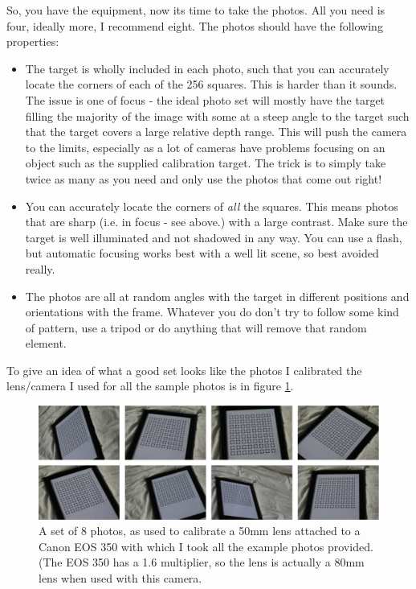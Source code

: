 \documentclass[10pt,a4paper,twoside]{article}
\begin{document}
So, you have the equipment, now its time to take the photos. All you need is four, ideally more, I recommend eight. The photos should have the following properties:
\begin{itemize}
\item The target is wholly included in each photo, such that you can accurately locate the corners of each of the 256 squares. This is harder than it sounds. The issue is one of focus - the ideal photo set will mostly have the target filling the majority of the image with some at a steep angle to the target such that the target covers a large relative depth range. This will push the camera to the limits, especially as a lot of cameras have problems focusing on an object such as the supplied calibration target. The trick is to simply take twice as many as you need and only use the photos that come out right!
\item You can accurately locate the corners of \emph{all} the squares. This means photos that are sharp (i.e. in focus - see above.) with a large contrast. Make sure the target is well illuminated and not shadowed in any way. You can use a flash, but automatic focusing works best with a well lit scene, so best avoided really.
\item The photos are all at random angles with the target in different positions and orientations with the frame. Whatever you do don't try to follow some kind of pattern, use a tripod or do anything that will remove that random element.
\end{itemize}
To give an idea of what a good set looks like the photos I calibrated the lens/camera I used for all the sample photos is in figure \ref{fig:calib_images}.

\begin{figure}
 \centering
 \includegraphics[width=1.0\textwidth]{screenshots/calib_images}
 \caption{A set of 8 photos, as used to calibrate a 50mm lens attached to a Canon EOS 350 with which I took all the example photos provided. (The EOS 350 has a 1.6 multiplier, so the lens is actually a 80mm lens when used with this camera.}
 \label{fig:calib_images}
\end{figure}
\end{document}

